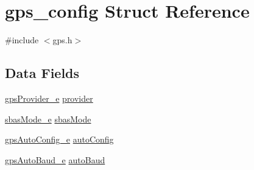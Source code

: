 \hypertarget{structgps__config}{\section{gps\+\_\+config Struct Reference}
\label{structgps__config}
}


{\ttfamily \#include $<$gps.\+h$>$}

\subsection*{Data Fields}
\begin{DoxyCompactItemize}
\item 
\hyperlink{config_2gps_8h_a50a4620e2a1bbefa83f1c86d3355fde7}{gps\+Provider\+\_\+e} \hyperlink{structgps__config_a05b1d4246609271957a0b0cbe43807fb}{provider}
\item 
\hyperlink{config_2gps_8h_a517917c9a4389dc3fbafd50e9b3f913a}{sbas\+Mode\+\_\+e} \hyperlink{structgps__config_a9e75b1ad7065c6aa941e8261ab5845f9}{sbas\+Mode}
\item 
\hyperlink{config_2gps_8h_ab7d412bd5ef91fa644df9b945a62eb6f}{gps\+Auto\+Config\+\_\+e} \hyperlink{structgps__config_a7479c2e918573d8499fd247a577bc8c4}{auto\+Config}
\item 
\hyperlink{config_2gps_8h_a04fd48aa0abe345c8bdf90f9b97a2231}{gps\+Auto\+Baud\+\_\+e} \hyperlink{structgps__config_af802fc33d04033d74ed42f29a423b9c6}{auto\+Baud}
\end{DoxyCompactItemize}


